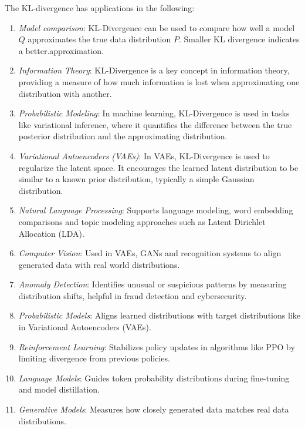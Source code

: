 \documentclass[a4paper, 12pt]{book}
\begin{document}
The $\mathrm{KL}$-divergence has applications in the following:
\begin{enumerate}
    \item \emph{Model comparison}: KL-Divergence can be used to compare how well a model $Q$ approximates the true data distribution $P$. Smaller KL divergence indicates a better.approximation.
    \item \emph{Information Theory}: KL-Divergence is a key concept in information theory, providing a measure of how much information is lost when approximating one distribution with another.
    \item \emph{Probabilistic Modeling}: In machine learning, KL-Divergence is used in tasks like variational inference, where it quantifies the difference between the true posterior distribution and the approximating distribution.
    \item \emph{Variational Autoencoders (VAEs)}: In VAEs, KL-Divergence is used to regularize the latent space. It encourages the learned latent distribution to be similar to a known prior distribution, typically a simple Gaussian distribution.
    \item \emph{Natural Language Processing}: Supports language modeling, word embedding comparisons and topic modeling approaches such as Latent Dirichlet Allocation (LDA).
    \item \emph{Computer Vision}: Used in VAEs, GANs and recognition systems to align generated data with real world distributions.
    \item \emph{Anomaly Detection}: Identifies unusual or suspicious patterns by measuring distribution shifts, helpful in fraud detection and cybersecurity.
    \item \emph{Probabilistic Models}: Aligns learned distributions with target distributions like in Variational Autoencoders (VAEs).
    \item \emph{Reinforcement Learning}: Stabilizes policy updates in algorithms like PPO by limiting divergence from previous policies.
    \item \emph{Language Models}: Guides token probability distributions during fine-tuning and model distillation.
    \item \emph{Generative Models}: Measures how closely generated data matches real data distributions.
\end{enumerate}

\end{document}
